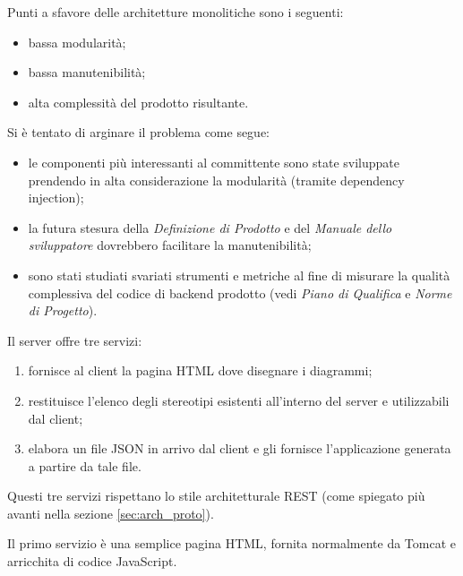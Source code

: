 Punti a sfavore delle architetture monolitiche sono i seguenti:
\begin{itemize}
\item bassa modularità;
\item bassa manutenibilità;
\item alta complessità del prodotto risultante.
\end{itemize}

Si è tentato di arginare il problema come segue:
\begin{itemize}
\item le componenti più interessanti al committente sono state sviluppate prendendo in alta considerazione la modularità (tramite dependency injection);
\item la futura stesura della \emph{Definizione di Prodotto} e del \emph{Manuale dello sviluppatore} dovrebbero facilitare la manutenibilità;
\item sono stati studiati svariati strumenti e metriche al fine di misurare la qualità complessiva del codice di backend prodotto (vedi \emph{Piano di Qualifica} e \emph{Norme di Progetto}).
\end{itemize}


Il server offre tre servizi:
\begin{enumerate}
	\item fornisce al client la pagina HTML dove disegnare i diagrammi;
	\item restituisce l'elenco degli stereotipi esistenti all'interno del server e utilizzabili dal client;
	\item elabora un file JSON in arrivo dal client e gli fornisce l'applicazione generata a partire da tale file.
\end{enumerate}
Questi tre servizi rispettano lo stile architetturale REST (come spiegato più avanti nella sezione \ref{sec:arch_proto}).

Il primo servizio è una semplice pagina HTML, fornita normalmente da Tomcat e arricchita di codice JavaScript.


